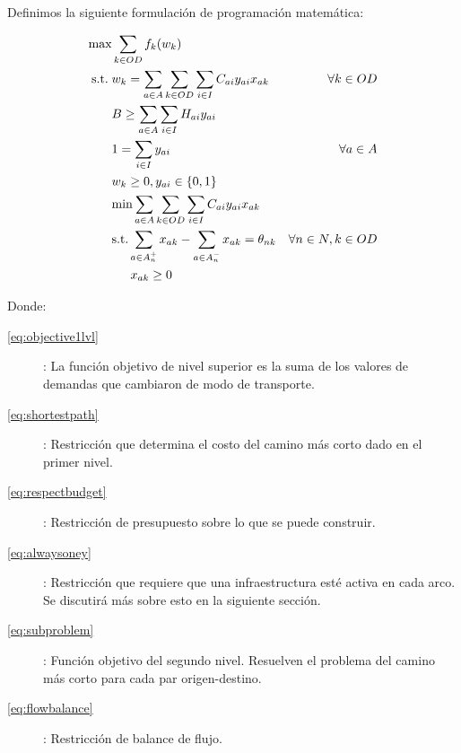 \documentclass{article}
\newcommand{\modelspace}{\hspace{1.5em}}
\begin{document}
  Definimos la siguiente formulación de programación matemática:

  \begin{align}
    \text{max}    & \sum_{k \in OD} f_k(w_k)                                                         & \label{eq:objective1lvl} \\
    \text{s.t.}\; & w_k = \sum_{a \in A} \sum_{k \in OD} \sum_{i \in I} C_{ai}y_{ai}x_{ak}           & \forall k \in OD \label{eq:shortestpath} \\
                  & B \geq \sum_{a \in A} \sum_{i \in I} H_{ai}y_{ai}                                & \label{eq:respectbudget} \\
                  & 1 = \sum_{i \in I} y_{ai}                                                        & \forall a \in A \label{eq:alwaysoney} \\
                  & w_k \geq 0, y_{ai} \in \{0,1\}                                                   & \nonumber \\
                  & \text{min} \sum_{a \in A} \sum_{k \in OD} \sum_{i \in I} C_{ai}y_{ai}x_{ak}      & \label{eq:subproblem} \\
                  & \text{s.t.} \sum_{a \in A_n^+} x_{ak} - \sum_{a \in A_n^-} x_{ak} = \theta_{nk}  & \forall n \in N, k \in OD \label{eq:flowbalance} \\
                  & \modelspace x_{ak} \geq 0                                                        & \nonumber
  \end{align}

  Donde:

  \begin{description}
    \item[\ref{eq:objective1lvl}]: La función objetivo de nivel superior es la suma de los valores de demandas que cambiaron de modo de transporte.
    \item[\ref{eq:shortestpath}]: Restricción que determina el costo del camino más corto dado en el primer nivel.
    \item[\ref{eq:respectbudget}]: Restricción de presupuesto sobre lo que se puede construir.
    \item[\ref{eq:alwaysoney}]: Restricción que requiere que una infraestructura esté activa en cada arco. Se discutirá más sobre esto en la siguiente sección.
    \item[\ref{eq:subproblem}]: Función objetivo del segundo nivel. Resuelven el problema del camino más corto para cada par origen-destino.
    \item[\ref{eq:flowbalance}]: Restricción de balance de flujo.
  \end{description}
\end{document}
